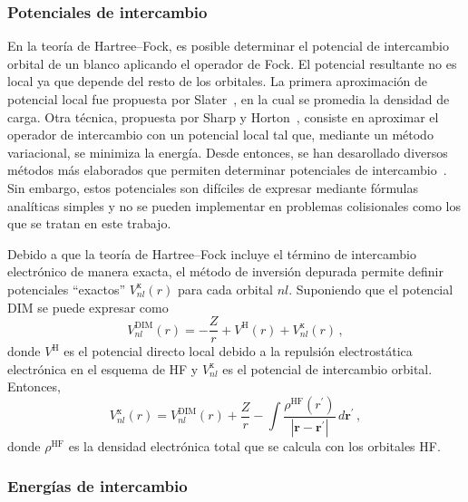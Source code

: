 \subsubsection*{Potenciales de intercambio}

En la teoría de Hartree--Fock, es posible determinar el potencial de 
intercambio orbital de un blanco aplicando el operador de Fock. El 
potencial resultante no es local ya que depende del resto de los 
orbitales. La primera aproximación de potencial local fue propuesta por 
Slater~\cite{Slater:51}, en la cual se promedia la densidad de carga. 
Otra técnica, propuesta por Sharp y Horton~\cite{Sharp:53}, consiste en 
aproximar el operador de intercambio con un potencial local tal que, 
mediante un método variacional, se minimiza la energía. Desde entonces, 
se han desarollado diversos métodos más elaborados que permiten 
determinar potenciales de intercambio~\cite{Krieger:92,Gorling:92,
Yang:02,Staroverov:06,Ryabinkin:13}. Sin embargo, estos potenciales son 
difíciles de expresar mediante fórmulas analíticas simples y no se 
pueden implementar en problemas colisionales como los que se tratan en 
este trabajo.

Debido a que la teoría de Hartree--Fock incluye el término de 
intercambio electrónico de manera exacta, el método de inversión 
depurada permite definir potenciales ``exactos'' 
$V_{nl}^{\mathrm{x}}(r)$ para cada orbital $nl$. Suponiendo que el 
potencial DIM se puede expresar como
\begin{equation}
V_{nl}^{\mathrm{DIM}}(r) = -\frac{Z}{r} + V^{\mathrm{H}}(r) 
+ V_{nl}^{\mathrm{x}}(r) \, , 
\label{eq:VDIM}
\end{equation}
donde $V^{\mathrm{H}}$ es el potencial directo local debido a la 
repulsión electrostática electrónica en el esquema de HF y 
$V_{nl}^{\mathrm{x}}$ es el potencial de intercambio orbital. Entonces,
\begin{equation}
V_{nl}^{\mathrm{x}}(r)=V_{nl}^{\mathrm{DIM}}(r)+\frac{Z}{r}
-\int{ \frac{\rho^{\mathrm{HF}}(r^{\prime})  }
{\left| \mathbf{r} - \mathbf{r^{\prime}} \right|}} \, 
d \mathbf{r^{\prime}} \, ,
\label{eq:exchange-potential}
\end{equation}
donde $\rho^{\mathrm{HF}}$ es la densidad electrónica total que se
calcula con los orbitales HF.

\subsubsection*{Energías de intercambio}

